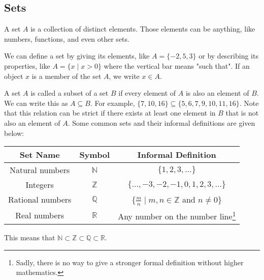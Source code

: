 \subsection{Sets}
\begin{definition}
	A set $A$ is a collection of distinct elements. Those elements can be anything, like numbers, functions, and even other sets.
\end{definition}
We can define a set by giving its elements, like $A = \{-2, 5, 3\}$ or by describing its properties, like $A = \{x \mid x > 0\}$ where the vertical bar means "such that".
If an object $x$ is a member of the set $A$, we write $x\in A$.\bigskip


\noindent
A set $A$ is called a subset of a set $B$ if every element of $A$ is also an element of $B$. 
We can write this as $A \subseteq B$. 
For example, $\{7, 10, 16\} \subseteq \{5, 6, 7, 9, 10, 11, 16\}$. 
Note that this relation can be strict if there exists at least one element in $B$ that is not also an element of $A$. 
Some common sets and their informal definitions are given below:

\begin{table}[H]
	\centering
	\begin{tabular}{c|c|c}
		Set Name & Symbol & Informal Definition                                                                                                                         \\ \hline
		Natural numbers & $\mathbb{N}$ & $\{1, 2, 3, \dots\}$           						                                                                        \\
		Integers & $\mathbb{Z}$ & $\{\dots, -3, -2, -1, 0, 1, 2, 3, \dots\}$                                                                                            \\
		Rational numbers & $\mathbb{Q}$ & $\{\frac{m}{n} \mid m,n \in\mathbb{Z}$ and $n \neq 0\}$                                                                       \\
		Real numbers & $\mathbb{R}$ & Any number on the number line\footnote{Sadly, there is no way to give a stronger formal definition without higher mathematics.}   \\
	\end{tabular}
\end{table}

This means that $\mathbb{N} \subset \mathbb{Z} \subset \mathbb{Q} \subset \mathbb{R}$.\bigskip


